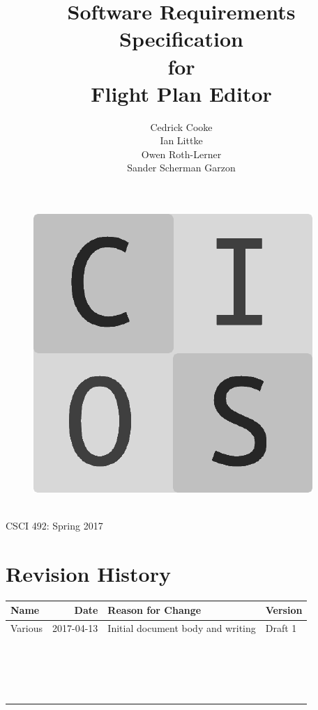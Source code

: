 \documentclass[12pt, letterpaper]{article}
\title{Software Requirements Specification\\for\\Flight Plan Editor}
\date{}
\author{
Cedrick Cooke\\
Ian Littke\\
Owen Roth-Lerner\\
Sander Scherman Garzon\\
}
\makeatletter
\renewcommand{\maketitle}{\bgroup\setlength{\parindent}{0pt}
\thispagestyle{empty}
\null

  \begin{flushleft}
  \vspace{15mm}
  \vskip2mm
  \Huge{\textbf{\@title}}
  \vspace{7cm}
\begin{figure}[ht]
  \begin{minipage}[b]{0.45\linewidth}
    \includegraphics[width=.75\textwidth]{images/cios.png}
  \end{minipage}
  \hspace{0.5cm}
  \begin{minipage}[b][][c]{0.45\linewidth}
    \LARGE{\@author}
  \vspace{0.35cm}
  \end{minipage}
\end{figure}
\\CSCI 492: Spring 2017\\
  \end{flushleft}\egroup
}
\makeatother
\begin{document}
\maketitle

\newpage
\pagestyle{style2}
\setcounter{page}{1}
\section*{Revision History}
\begin{tabularx}{\textwidth}{|l|r|X|l|}
\hline
\textbf{Name} & \textbf{Date} & \textbf{Reason for Change} & \textbf{Version} \\ \hline
Various & 2017-04-13 & Initial document body and writing & Draft 1 \\ \hline
        &            &                                   &         \\ \hline
        &            &                                   &         \\ \hline
        &            &                                   &         \\ \hline
        &            &                                   &         \\ \hline
        &            &                                   &         \\ \hline
        &            &                                   &         \\ \hline
        &            &                                   &         \\ \hline
        &            &                                   &         \\ \hline
        &            &                                   &         \\ \hline
        &            &                                   &         \\ \hline
        &            &                                   &         \\ \hline
        &            &                                   &         \\ \hline
        &            &                                   &         \\ \hline
        &            &                                   &         \\ \hline
        &            &                                   &         \\ \hline
        &            &                                   &         \\ \hline
        &            &                                   &         \\ \hline
        &            &                                   &         \\ \hline
\end{tabularx}
\end{document}
